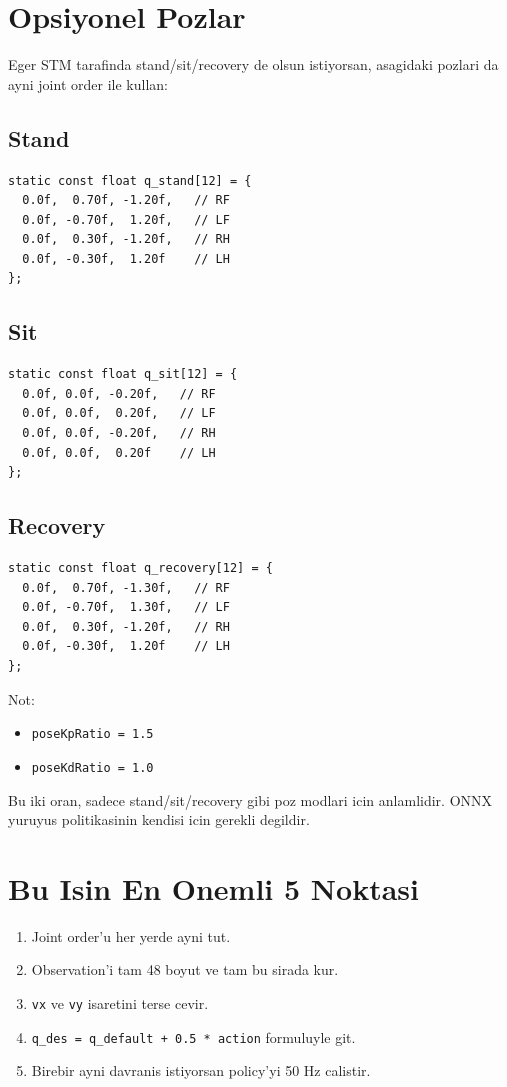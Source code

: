 \documentclass[11pt,a4paper]{article}
\begin{document}
\section{Opsiyonel Pozlar}
Eger STM tarafinda stand/sit/recovery de olsun istiyorsan, asagidaki pozlari da ayni joint order ile kullan:

\subsection*{Stand}
\begin{lstlisting}
static const float q_stand[12] = {
  0.0f,  0.70f, -1.20f,   // RF
  0.0f, -0.70f,  1.20f,   // LF
  0.0f,  0.30f, -1.20f,   // RH
  0.0f, -0.30f,  1.20f    // LH
};
\end{lstlisting}

\subsection*{Sit}
\begin{lstlisting}
static const float q_sit[12] = {
  0.0f, 0.0f, -0.20f,   // RF
  0.0f, 0.0f,  0.20f,   // LF
  0.0f, 0.0f, -0.20f,   // RH
  0.0f, 0.0f,  0.20f    // LH
};
\end{lstlisting}

\subsection*{Recovery}
\begin{lstlisting}
static const float q_recovery[12] = {
  0.0f,  0.70f, -1.30f,   // RF
  0.0f, -0.70f,  1.30f,   // LF
  0.0f,  0.30f, -1.20f,   // RH
  0.0f, -0.30f,  1.20f    // LH
};
\end{lstlisting}

\noindent
Not:
\begin{itemize}
  \item \texttt{poseKpRatio = 1.5}
  \item \texttt{poseKdRatio = 1.0}
\end{itemize}
Bu iki oran, sadece stand/sit/recovery gibi poz modlari icin anlamlidir. ONNX yuruyus politikasinin kendisi icin gerekli degildir.

\section{Bu Isin En Onemli 5 Noktasi}
\begin{enumerate}
  \item Joint order'u her yerde ayni tut.
  \item Observation'i tam 48 boyut ve tam bu sirada kur.
  \item \texttt{vx} ve \texttt{vy} isaretini terse cevir.
  \item \texttt{q\_des = q\_default + 0.5 * action} formuluyle git.
  \item Birebir ayni davranis istiyorsan policy'yi 50 Hz calistir.
\end{enumerate}
\end{document}
